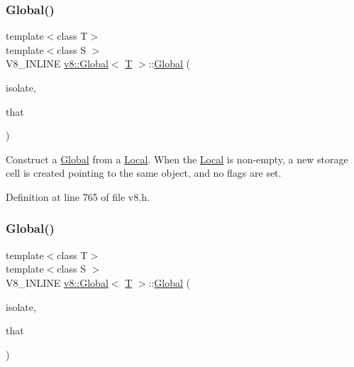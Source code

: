 \subsubsection{\texorpdfstring{Global()}{Global()}\hspace{0.1cm}{\footnotesize\ttfamily [2/4]}}
{\footnotesize\ttfamily template$<$class T$>$ \\
template$<$class S $>$ \\
V8\+\_\+\+I\+N\+L\+I\+NE \mbox{\hyperlink{classv8_1_1Global}{v8\+::\+Global}}$<$ \mbox{\hyperlink{classv8_1_1internal_1_1torque_1_1T}{T}} $>$\+::\mbox{\hyperlink{classv8_1_1Global}{Global}} (\begin{DoxyParamCaption}\item[{Isolate $\ast$}]{isolate,  }\item[{\mbox{\hyperlink{classv8_1_1Local}{Local}}$<$ S $>$}]{that }\end{DoxyParamCaption})\hspace{0.3cm}{\ttfamily [inline]}}

Construct a \mbox{\hyperlink{classv8_1_1Global}{Global}} from a \mbox{\hyperlink{classv8_1_1Local}{Local}}. When the \mbox{\hyperlink{classv8_1_1Local}{Local}} is non-\/empty, a new storage cell is created pointing to the same object, and no flags are set. 

Definition at line 765 of file v8.\+h.

\mbox{\label{classv8_1_1Global_a6243ecb28bb97d066065796fa28f7415}} 
\subsubsection{\texorpdfstring{Global()}{Global()}\hspace{0.1cm}{\footnotesize\ttfamily [3/4]}}
{\footnotesize\ttfamily template$<$class T$>$ \\
template$<$class S $>$ \\
V8\+\_\+\+I\+N\+L\+I\+NE \mbox{\hyperlink{classv8_1_1Global}{v8\+::\+Global}}$<$ \mbox{\hyperlink{classv8_1_1internal_1_1torque_1_1T}{T}} $>$\+::\mbox{\hyperlink{classv8_1_1Global}{Global}} (\begin{DoxyParamCaption}\item[{Isolate $\ast$}]{isolate,  }\item[{const \mbox{\hyperlink{classv8_1_1PersistentBase}{Persistent\+Base}}$<$ S $>$ \&}]{that }\end{DoxyParamCaption})\hspace{0.3cm}{\ttfamily [inline]}}

